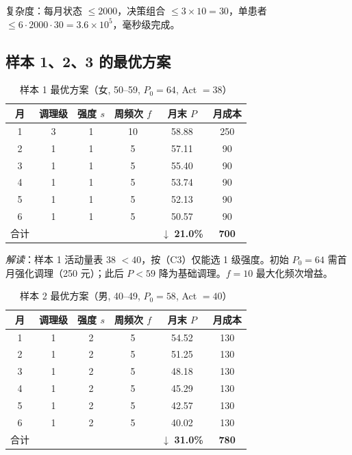 \documentclass{MathorCupmodeling}
\begin{document}
复杂度：每月状态 $\le 2000$，决策组合 $\le 3 \times 10 = 30$，单患者 $\le 6 \cdot 2000 \cdot 30 = 3.6 \times 10^5$，毫秒级完成。

\subsection{样本 1、2、3 的最优方案}

\begin{table}[H]
\centering\small
\caption{样本 1 最优方案（女, 50--59, $P_0 = 64$, Act $= 38$）}
\begin{tabular}{@{}c c c c c c@{}}
\toprule
月 & 调理级 & 强度 $s$ & 周频次 $f$ & 月末 $P$ & 月成本 \\
\midrule
1 & 3 & 1 & 10 & 58.88 & 250 \\
2 & 1 & 1 & 5  & 57.11 & 90 \\
3 & 1 & 1 & 5  & 55.40 & 90 \\
4 & 1 & 1 & 5  & 53.74 & 90 \\
5 & 1 & 1 & 5  & 52.13 & 90 \\
6 & 1 & 1 & 5  & 50.57 & 90 \\
\midrule
合计 & & & & $\downarrow$ \textbf{21.0\%} & \textbf{700} \\
\bottomrule
\end{tabular}
\end{table}

\textit{解读}：样本 1 活动量表 38 $<40$，按（C3）仅能选 1 级强度。初始 $P_0=64$ 需首月强化调理（250 元）；此后 $P<59$ 降为基础调理。$f=10$ 最大化频次增益。

\begin{table}[H]
\centering\small
\caption{样本 2 最优方案（男, 40--49, $P_0 = 58$, Act $= 40$）}
\begin{tabular}{@{}c c c c c c@{}}
\toprule
月 & 调理级 & 强度 $s$ & 周频次 $f$ & 月末 $P$ & 月成本 \\
\midrule
1 & 1 & 2 & 5 & 54.52 & 130 \\
2 & 1 & 2 & 5 & 51.25 & 130 \\
3 & 1 & 2 & 5 & 48.18 & 130 \\
4 & 1 & 2 & 5 & 45.29 & 130 \\
5 & 1 & 2 & 5 & 42.57 & 130 \\
6 & 1 & 2 & 5 & 40.02 & 130 \\
\midrule
合计 & & & & $\downarrow$ \textbf{31.0\%} & \textbf{780} \\
\bottomrule
\end{tabular}
\end{table}
\end{document}
